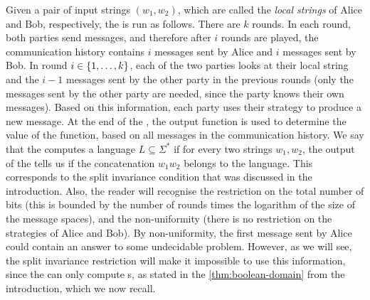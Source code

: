 Given a pair of input strings $(w_1,w_2)$, which are called the \emph{local
strings} of Alice and Bob, respectively, the   is run as follows. There
are $k$ rounds. In each round, both parties send messages, and therefore after
$i$ rounds are played, the communication history contains $i$ messages sent by
Alice and $i$ messages sent by Bob.  In round  $i \in \{1,\ldots,k\}$,  each
of the two parties  looks at their local string and the $i-1$ messages sent by
the other party in the previous rounds (only the messages sent by the other
party are needed, since the party knows their own messages). Based on this
information, each party uses their strategy to produce a new message. At the
end of the , the output function is used to determine the value of the
function, based on all messages in  the communication history. We say that the
 computes a language $L \subseteq \Sigma^*$ if for every two strings
$w_1,w_2$, the output of the  tells us if the concatenation $w_1w_2$
belongs to the language. This corresponds to the split invariance condition
that was discussed in the introduction.  Also, the reader will recognise the
restriction on the total number of bits (this is bounded by the number of
rounds times the logarithm of the size of the message spaces), and the
non-uniformity (there is no restriction on the strategies of Alice and Bob). By
non-uniformity, the first message sent by Alice could contain an answer to some
undecidable problem. However, as we will see, the split invariance restriction
will make it impossible to use this information, since the  can only
compute s, as stated in the \cref{thm:boolean-domain} from the
introduction, which we now recall.


\booleandomain*


